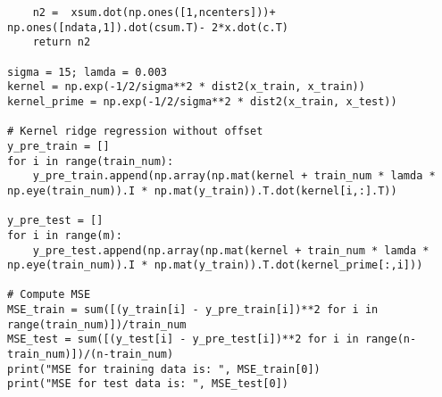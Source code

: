 \documentclass[letterpaper,11pt]{article}
\begin{document}
\begin{spacing}{1.2}
\begin{lstlisting}
    n2 =  xsum.dot(np.ones([1,ncenters]))+ np.ones([ndata,1]).dot(csum.T)- 2*x.dot(c.T)
    return n2

sigma = 15; lamda = 0.003
kernel = np.exp(-1/2/sigma**2 * dist2(x_train, x_train))
kernel_prime = np.exp(-1/2/sigma**2 * dist2(x_train, x_test))

# Kernel ridge regression without offset
y_pre_train = []
for i in range(train_num):
    y_pre_train.append(np.array(np.mat(kernel + train_num * lamda * np.eye(train_num)).I * np.mat(y_train)).T.dot(kernel[i,:].T))

y_pre_test = []
for i in range(m):
    y_pre_test.append(np.array(np.mat(kernel + train_num * lamda * np.eye(train_num)).I * np.mat(y_train)).T.dot(kernel_prime[:,i]))

# Compute MSE
MSE_train = sum([(y_train[i] - y_pre_train[i])**2 for i in range(train_num)])/train_num
MSE_test = sum([(y_test[i] - y_pre_test[i])**2 for i in range(n-train_num)])/(n-train_num)
print("MSE for training data is: ", MSE_train[0])
print("MSE for test data is: ", MSE_test[0])
\end{lstlisting}

\end{spacing}
\end{document}
